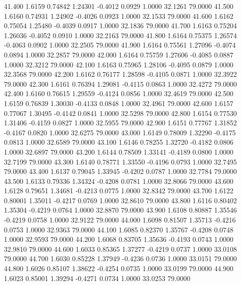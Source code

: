   41.400   1.6159   0.74842   1.24301  -0.4012   0.0929   1.0000  32.1261  79.0000
  41.500   1.6160   0.74931   1.24902  -0.4026   0.0923   1.0000  32.1533  79.0000
  41.600   1.6162   0.75054   1.25480  -0.4039   0.0917   1.0000  32.1836  79.0000
  41.700   1.6163   0.75204   1.26036  -0.4052   0.0910   1.0000  32.2163  79.0000
  41.800   1.6164   0.75375   1.26574  -0.4063   0.0902   1.0000  32.2505  79.0000
  41.900   1.6164   0.75561   1.27096  -0.4074   0.0894   1.0000  32.2857  79.0000
  42.000   1.6164   0.75759   1.27606  -0.4085   0.0887   1.0000  32.3212  79.0000
  42.100   1.6163   0.75965   1.28106  -0.4095   0.0879   1.0000  32.3568  79.0000
  42.200   1.6162   0.76177   1.28598  -0.4105   0.0871   1.0000  32.3922  79.0000
  42.300   1.6161   0.76394   1.29081  -0.4115   0.0863   1.0000  32.4272  79.0000
  42.400   1.6160   0.76615   1.29559  -0.4124   0.0856   1.0000  32.4619  79.0000
  42.500   1.6159   0.76839   1.30030  -0.4133   0.0848   1.0000  32.4961  79.0000
  42.600   1.6157   0.77067   1.30495  -0.4142   0.0841   1.0000  32.5298  79.0000
  42.800   1.6154   0.77530   1.31406  -0.4159   0.0827   1.0000  32.5955  79.0000
  42.900   1.6151   0.77767   1.31852  -0.4167   0.0820   1.0000  32.6275  79.0000
  43.000   1.6149   0.78009   1.32290  -0.4175   0.0813   1.0000  32.6589  79.0000
  43.100   1.6146   0.78255   1.32720  -0.4182   0.0806   1.0000  32.6897  79.0000
  43.200   1.6144   0.78509   1.33141  -0.4189   0.0800   1.0000  32.7199  79.0000
  43.300   1.6140   0.78771   1.33550  -0.4196   0.0793   1.0000  32.7495  79.0000
  43.400   1.6137   0.79045   1.33945  -0.4202   0.0787   1.0000  32.7784  79.0000
  43.500   1.6133   0.79336   1.34324  -0.4208   0.0781   1.0000  32.8066  79.0000
  43.600   1.6128   0.79651   1.34681  -0.4213   0.0775   1.0000  32.8342  79.0000
  43.700   1.6122   0.80001   1.35011  -0.4217   0.0769   1.0000  32.8610  79.0000
  43.800   1.6116   0.80402   1.35304  -0.4219   0.0764   1.0000  32.8870  79.0000
  43.900   1.6108   0.80887   1.35546  -0.4219   0.0758   1.0000  32.9122  79.0000
  44.000   1.6098   0.81507   1.35713  -0.4216   0.0753   1.0000  32.9363  79.0000
  44.100   1.6085   0.82370   1.35767  -0.4208   0.0748   1.0000  32.9593  79.0000
  44.200   1.6068   0.83705   1.35636  -0.4193   0.0743   1.0000  32.9810  79.0000
  44.600   1.6033   0.85365   1.37277  -0.4219   0.0737   1.0000  33.0108  79.0000
  44.700   1.6030   0.85228   1.37949  -0.4236   0.0736   1.0000  33.0151  79.0000
  44.800   1.6026   0.85107   1.38622  -0.4254   0.0735   1.0000  33.0199  79.0000
  44.900   1.6023   0.85001   1.39294  -0.4271   0.0734   1.0000  33.0253  79.0000
